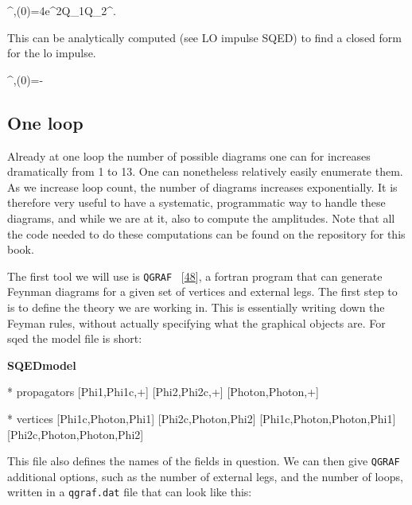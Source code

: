 \documentclass[
  10pt,
  a4paper,
  DIV=11,
  numbers=noendperiod,
  twoside]{scrreprt}
\newenvironment{Shaded}{\begin{snugshade}}{\end{snugshade}}
\newcommand{\NormalTok}[1]{\textcolor[rgb]{0.00,0.23,0.31}{#1}}
\let\[\relax \let\]\relax %
\DeclareRobustCommand{\[}{\begin{equation}}
\DeclareRobustCommand{\]}{\end{equation}}
\begin{document}
\[
\Delta \emom[1]^{\mu,(0)}=4e^2Q_1Q_2\mass[1]\mass[2]\relfact\int\dn[4]{\tw}\tw^\mu {}.
\]

This can be analytically computed (see LO impulse SQED) to find a closed
form for the \gls{lo} impulse.

\[
\Delta \emom[1]^{\mu,(0)}=-  
\]

\hypertarget{one-loop}{%
\subsection{One loop}\label{one-loop}}

Already at one loop the number of possible diagrams one can for
increases dramatically from 1 to 13. One can nonetheless relatively
easily enumerate them. As we increase loop count, the number of diagrams
increases exponentially. It is therefore very useful to have a
systematic, programmatic way to handle these diagrams, and while we are
at it, also to compute the amplitudes. Note that all the code needed to
do these computations can be found on the repository for this book.

The first tool we will use is \texttt{QGRAF}
~{[}\protect\hyperlink{ref-Nogueira:1993a}{48}{]}, a fortran program
that can generate Feynman diagrams for a given set of vertices and
external legs. The first step to is to define the theory we are working
in. This is essentially writing down the Feyman rules, without actually
specifying what the graphical objects are. For \gls{sqed} the model file
is short:

\textbf{SQEDmodel}

\begin{Shaded}
\begin{Highlighting}[]
\NormalTok{* propagators}
\NormalTok{ [Phi1,Phi1c,+]}
\NormalTok{ [Phi2,Phi2c,+]}
\NormalTok{ [Photon,Photon,+]}

\NormalTok{* vertices}
\NormalTok{ [Phi1c,Photon,Phi1]}
\NormalTok{ [Phi2c,Photon,Phi2]}
\NormalTok{ [Phi1c,Photon,Photon,Phi1]}
\NormalTok{ [Phi2c,Photon,Photon,Phi2]}
\end{Highlighting}
\end{Shaded}

This file also defines the names of the fields in question. We can then
give \texttt{QGRAF} additional options, such as the number of external
legs, and the number of loops, written in a \texttt{qgraf.dat} file that
can look like this:
\end{document}
